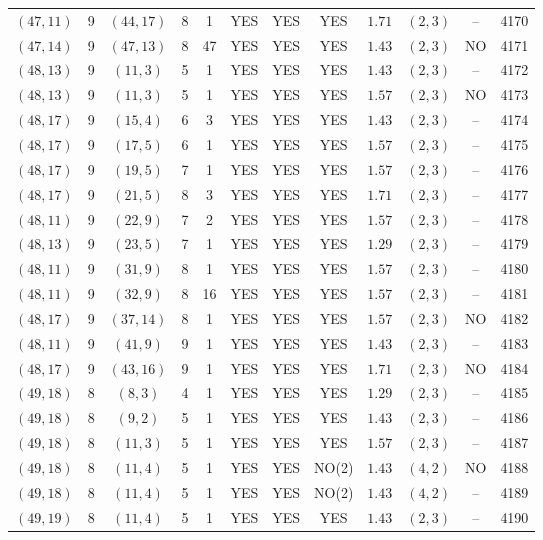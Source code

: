 \begin{longtable}{|c|c|c|c|c|c|c|c|c|c|c|c|}
$(47,11)$ & 9 & $(44,17)$ & 8 & 1 & YES & YES & YES & $1.71$ & $(2,3)$ & -- & 4170\\
$(47,14)$ & 9 & $(47,13)$ & 8 & 47 & YES & YES & YES & $1.43$ & $(2,3)$ & NO & 4171\\
$(48,13)$ & 9 & $(11,3)$ & 5 & 1 & YES & YES & YES & $1.43$ & $(2,3)$ & -- & 4172\\
$(48,13)$ & 9 & $(11,3)$ & 5 & 1 & YES & YES & YES & $1.57$ & $(2,3)$ & NO & 4173\\
$(48,17)$ & 9 & $(15,4)$ & 6 & 3 & YES & YES & YES & $1.43$ & $(2,3)$ & -- & 4174\\
$(48,17)$ & 9 & $(17,5)$ & 6 & 1 & YES & YES & YES & $1.57$ & $(2,3)$ & -- & 4175\\
$(48,17)$ & 9 & $(19,5)$ & 7 & 1 & YES & YES & YES & $1.57$ & $(2,3)$ & -- & 4176\\
$(48,17)$ & 9 & $(21,5)$ & 8 & 3 & YES & YES & YES & $1.71$ & $(2,3)$ & -- & 4177\\
$(48,11)$ & 9 & $(22,9)$ & 7 & 2 & YES & YES & YES & $1.57$ & $(2,3)$ & -- & 4178\\
$(48,13)$ & 9 & $(23,5)$ & 7 & 1 & YES & YES & YES & $1.29$ & $(2,3)$ & -- & 4179\\
$(48,11)$ & 9 & $(31,9)$ & 8 & 1 & YES & YES & YES & $1.57$ & $(2,3)$ & -- & 4180\\
$(48,11)$ & 9 & $(32,9)$ & 8 & 16 & YES & YES & YES & $1.57$ & $(2,3)$ & -- & 4181\\
$(48,17)$ & 9 & $(37,14)$ & 8 & 1 & YES & YES & YES & $1.57$ & $(2,3)$ & NO & 4182\\
$(48,11)$ & 9 & $(41,9)$ & 9 & 1 & YES & YES & YES & $1.43$ & $(2,3)$ & -- & 4183\\
$(48,17)$ & 9 & $(43,16)$ & 9 & 1 & YES & YES & YES & $1.71$ & $(2,3)$ & NO & 4184\\
$(49,18)$ & 8 & $(8,3)$ & 4 & 1 & YES & YES & YES & $1.29$ & $(2,3)$ & -- & 4185\\
$(49,18)$ & 8 & $(9,2)$ & 5 & 1 & YES & YES & YES & $1.43$ & $(2,3)$ & -- & 4186\\
$(49,18)$ & 8 & $(11,3)$ & 5 & 1 & YES & YES & YES & $1.57$ & $(2,3)$ & -- & 4187\\
$(49,18)$ & 8 & $(11,4)$ & 5 & 1 & YES & YES & NO(2) & $1.43$ & $(4,2)$ & NO & 4188\\
$(49,18)$ & 8 & $(11,4)$ & 5 & 1 & YES & YES & NO(2) & $1.43$ & $(4,2)$ & -- & 4189\\
$(49,19)$ & 8 & $(11,4)$ & 5 & 1 & YES & YES & YES & $1.43$ & $(2,3)$ & -- & 4190\\

\end{longtable}
